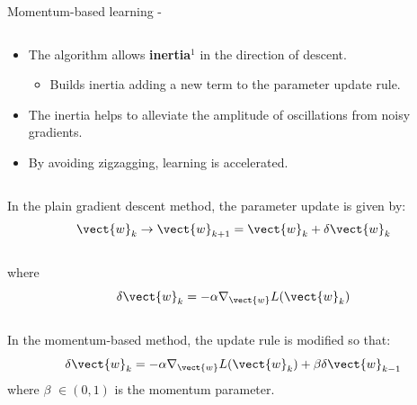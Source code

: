 \begin{frame}[t,allowframebreaks]{
    Momentum-based learning -}
\begin{columns}
\begin{column}{0.50\textwidth}
\begin{itemize}
                \item
                The algorithm allows {\bf inertia}$^{1}$ 
                in the direction of descent.\\
                \begin{itemize}
                    \small
                    \item Builds inertia adding 
                    a new term to the parameter update rule.
                \end{itemize}
                \item
                The inertia helps to alleviate the amplitude 
                of oscillations from noisy 
                \glspl{gradient}.\\
                \item
                By avoiding zigzagging, learning is accelerated.\\
            \end{itemize}
        \end{column}
    \end{columns}

    \framebreak

 
    In the plain \gls{gradient descent}
    method, the parameter update is given by:
    \begin{equation}
        \vect{w}_{k} \rightarrow \vect{w}_{k+1} = 
            \vect{w}_{k} + \delta \vect{w}_{k} 
    \end{equation}\\
    where 
    \begin{equation}
        \delta \vect{w}_{k} = - \alpha \nabla_{\vect{w}} L(\vect{w}_{k})
    \end{equation}\\

    In the \gls{momentum}-based method,
    the update rule is modified so that: 
    \begin{equation}
        \delta \vect{w}_{k} = 
          - \alpha \nabla_{\vect{w}} L(\vect{w}_{k})
          + \beta \delta \vect{w}_{k-1}
        \label{eq:momentum_method_update_rule}
    \end{equation}
    where $\beta$ $\in (0,1)$ is the 
    \gls{momentum parameter}.\\

    \vspace{0.2cm}


\end{frame}

